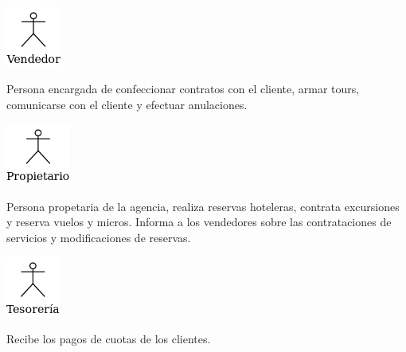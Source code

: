 \documentclass[12pt,a4paper,titlepage,oneside]{article}
\begin{document}
\vspace*{1.5cm}

\begin{minipage}[b]{0.2\linewidth}\centering
	\includegraphics[height=2cm]{actor_vendedor}
\end{minipage}
\begin{minipage}[b]{0.8\linewidth}\centering
	\begin{flushleft}
	Persona encargada de confeccionar contratos con el cliente, armar tours, comunicarse con el cliente y efectuar anulaciones. \\
	\end{flushleft}
\end{minipage}

\vspace*{1.5cm}


\begin{minipage}[b]{0.2\linewidth}\centering
	\includegraphics[height=2cm]{actor_propietario}
\end{minipage}
\begin{minipage}[b]{0.8\linewidth}\centering
	\begin{flushleft}
	Persona propetaria de la agencia, realiza reservas hoteleras, contrata excursiones y reserva vuelos y micros. Informa a los vendedores sobre las contrataciones de servicios y modificaciones de reservas. \\
	\end{flushleft}
\end{minipage}


\vspace*{1.5cm}


\begin{minipage}[b]{0.2\linewidth}\centering
	\includegraphics[height=2cm]{actor_tesoreria}
\end{minipage}
\begin{minipage}[b]{0.8\linewidth}\centering
	\begin{flushleft}
	Recibe los pagos de cuotas de los clientes. \\
	\end{flushleft}
\end{minipage}
\end{document}
